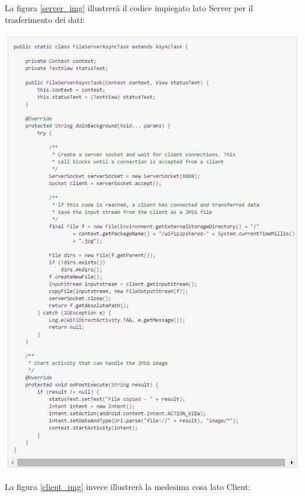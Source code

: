 La figura \ref{server_img} illustrerà il codice impiegato lato Server per il trasferimento dei dati:


\begin{center}
\includegraphics[width=1\textwidth]{imgs/server.jpg}
\label{server_img}%
\end{center}

La figura \ref{client_img} invece illustrerà la medesima cosa lato Client:

